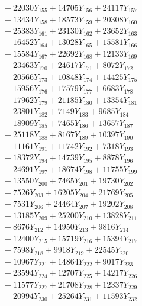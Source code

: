 \documentclass[a4paper,10pt]{article}
\begin{document}
{\begin{align}
&\;  + 22030 Y_{155} + 14705 Y_{156} + 24117 Y_{157} \\[0.3ex]
&\;  + 13434 Y_{158} + 18573 Y_{159} + 20308 Y_{160} \\[0.3ex]
&\;  + 25383 Y_{161} + 23130 Y_{162} + 23652 Y_{163} \\[0.3ex]
&\;  + 16452 Y_{164} + 13028 Y_{165} + 15581 Y_{166} \\[0.3ex]
&\;  + 15584 Y_{167} + 22692 Y_{168} + 12133 Y_{169} \\[0.3ex]
&\;  + 23463 Y_{170} + 24617 Y_{171} + 8072 Y_{172} \\[0.3ex]
&\;  + 20566 Y_{173} + 10848 Y_{174} + 14425 Y_{175} \\[0.3ex]
&\;  + 15956 Y_{176} + 17579 Y_{177} + 6683 Y_{178} \\[0.5ex]\allowbreak
&\;  + 17962 Y_{179} + 21185 Y_{180} + 13354 Y_{181} \\[0.3ex]
&\;  + 23801 Y_{182} + 7149 Y_{183} + 9685 Y_{184} \\[0.3ex]
&\;  + 18909 Y_{185} + 7465 Y_{186} + 13657 Y_{187} \\[0.3ex]
&\;  + 25118 Y_{188} + 8167 Y_{189} + 10397 Y_{190} \\[0.3ex]
&\;  + 11161 Y_{191} + 11742 Y_{192} + 7318 Y_{193} \\[0.3ex]
&\;  + 18372 Y_{194} + 14739 Y_{195} + 8878 Y_{196} \\[0.3ex]
&\;  + 24691 Y_{197} + 18674 Y_{198} + 11755 Y_{199} \\[0.3ex]
&\;  + 13550 Y_{200} + 7465 Y_{201} + 19730 Y_{202} \\[0.3ex]
&\;  + 7526 Y_{203} + 16205 Y_{204} + 21769 Y_{205} \\[0.3ex]
&\;  + 7531 Y_{206} + 24464 Y_{207} + 19202 Y_{208} \\[0.5ex]\allowbreak
&\;  + 13185 Y_{209} + 25200 Y_{210} + 13828 Y_{211} \\[0.3ex]
&\;  + 8676 Y_{212} + 14950 Y_{213} + 9816 Y_{214} \\[0.3ex]
&\;  + 12400 Y_{215} + 15719 Y_{216} + 15394 Y_{217} \\[0.3ex]
&\;  + 7598 Y_{218} + 9918 Y_{219} + 22545 Y_{220} \\[0.3ex]
&\;  + 10967 Y_{221} + 14864 Y_{222} + 9017 Y_{223} \\[0.3ex]
&\;  + 23594 Y_{224} + 12707 Y_{225} + 14217 Y_{226} \\[0.3ex]
&\;  + 11577 Y_{227} + 21708 Y_{228} + 12337 Y_{229} \\[0.3ex]
&\;  + 20994 Y_{230} + 25264 Y_{231} + 11593 Y_{232} \\[0.3ex]

\end{align}}
\end{document}
